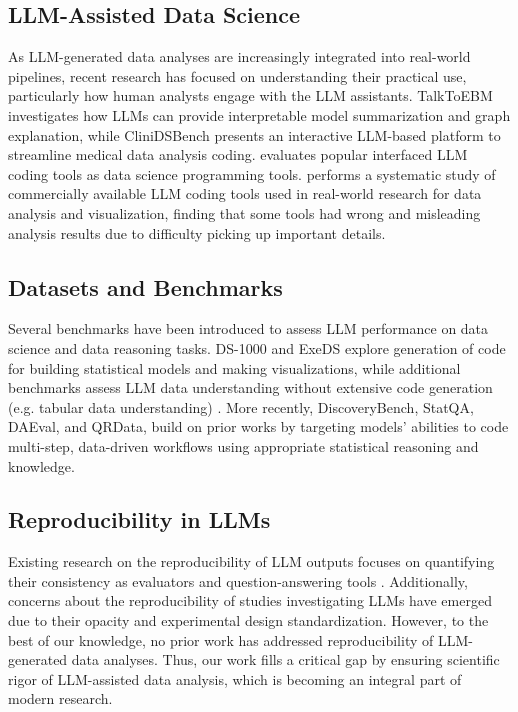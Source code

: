 \subsection{LLM-Assisted Data Science} 
As LLM-generated data analyses are increasingly integrated into real-world pipelines, recent research has focused on understanding their practical use, particularly how human analysts engage with the LLM assistants.
TalkToEBM \citep{bordt2024datascience} investigates how LLMs can provide interpretable model summarization and graph explanation, while CliniDSBench \citep{wang2024large} 
presents an interactive LLM-based platform to streamline medical data analysis coding. \citet{nascimento2024llm4ds} evaluates popular interfaced LLM coding tools as data science programming tools.
\citet{nejjar2024llms} performs a systematic study of commercially available LLM coding tools used in real-world research for 
data analysis and visualization, finding that some tools had wrong and misleading analysis results due to difficulty picking up important details. 

\subsection{Datasets and Benchmarks}
Several benchmarks have been introduced to assess LLM performance on data science and data reasoning tasks. DS-1000 \citep{lai2022ds1000} and ExeDS \citep{huang2022execution} explore generation of code for building statistical models and making visualizations, 
while additional benchmarks assess LLM data understanding without extensive code generation (e.g. tabular data understanding) \cite{zhao2022multihiertt, yu2018spider, hazoom2021text}. 
More recently, DiscoveryBench, StatQA, DAEval, and QRData, \citep{majumder2024discoverybench, zhu2024large, hu2024infiagent, liu2024llms} build on prior works by targeting models’ abilities to code multi-step, data-driven workflows using appropriate statistical reasoning and knowledge.

\subsection{Reproducibility in LLMs}

Existing research on the reproducibility of LLM outputs focuses on quantifying their consistency as evaluators \citep{lee2024evaluatingconsistency} and question-answering tools \citep{lee2024evaluatingconsistenciesllm}. Additionally, concerns about the reproducibility of studies investigating LLMs have emerged due to their opacity and experimental design standardization\citep{vaugrante2024looming}. However, to the best of our knowledge, no prior work has addressed reproducibility of LLM-generated data analyses. Thus, our work fills a critical gap by ensuring scientific rigor of LLM-assisted data analysis, which is becoming an integral part of modern research.